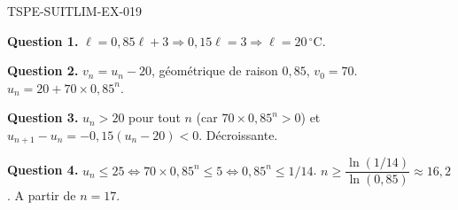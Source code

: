 \begin{corrige}{TSPE-SUITLIM-EX-019}

\textbf{Question 1.} $\ell = 0{,}85\ell + 3 \Rightarrow 0{,}15\ell = 3 \Rightarrow \ell = 20\,^\circ$C.

\textbf{Question 2.} $v_n = u_n - 20$, géométrique de raison $0{,}85$, $v_0 = 70$. $u_n = 20 + 70 \times 0{,}85^n$.

\textbf{Question 3.} $u_n > 20$ pour tout $n$ (car $70 \times 0{,}85^n > 0$) et $u_{n+1} - u_n = -0{,}15(u_n - 20) < 0$. Décroissante.

\textbf{Question 4.} $u_n \leq 25 \iff 70 \times 0{,}85^n \leq 5 \iff 0{,}85^n \leq 1/14$. $n \geq \dfrac{\ln(1/14)}{\ln(0{,}85)} \approx 16{,}2$. A partir de $\boxed{n = 17}$.

\end{corrige}
